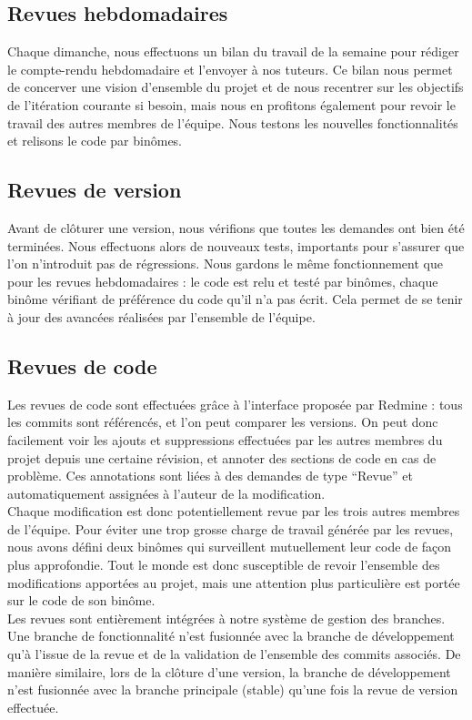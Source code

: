 \subsection{Revues hebdomadaires}

Chaque dimanche, nous effectuons un bilan du travail de la semaine pour rédiger le compte-rendu hebdomadaire et l'envoyer à nos tuteurs. Ce bilan nous permet de concerver une vision d'ensemble du projet et de nous recentrer sur les objectifs de l'itération courante si besoin, mais nous en profitons également pour revoir le travail des autres membres de l'équipe. Nous testons les nouvelles fonctionnalités et relisons le code par binômes.

\subsection{Revues de version}

Avant de clôturer une version, nous vérifions que toutes les demandes ont bien été terminées. Nous effectuons alors de nouveaux tests, importants pour s'assurer que l'on n'introduit pas de régressions. Nous gardons le même fonctionnement que pour les revues hebdomadaires : le code est relu et testé par binômes, chaque binôme vérifiant de préférence du code qu'il n'a pas écrit. Cela permet de se tenir à jour des avancées réalisées par l'ensemble de l'équipe.

\subsection{Revues de code}

Les revues de code sont effectuées grâce à l'interface proposée par Redmine : tous les commits sont référencés, et l'on peut comparer les versions. On peut donc facilement voir les ajouts et suppressions effectuées par les autres membres du projet depuis une certaine révision, et annoter des sections de code en cas de problème. Ces annotations sont liées à des demandes de type ``Revue'' et automatiquement assignées à l'auteur de la modification.\\

Chaque modification est donc potentiellement revue par les trois autres membres de l'équipe. Pour éviter une trop grosse charge de travail générée par les revues, nous avons défini deux binômes qui surveillent mutuellement leur code de façon plus approfondie. Tout le monde est donc susceptible de revoir l'ensemble des modifications apportées au projet, mais une attention plus particulière est portée sur le code de son binôme.\\

Les revues sont entièrement intégrées à notre système de gestion des branches. Une branche de fonctionnalité n'est fusionnée avec la branche de développement qu'à l'issue de la revue et de la validation de l'ensemble des commits associés. De manière similaire, lors de la clôture d'une version, la branche de développement n'est fusionnée avec la branche principale (stable) qu'une fois la revue de version effectuée.
